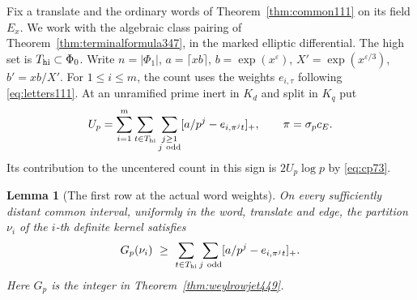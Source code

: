 \documentclass[a4paper,11pt]{article}
\newtheorem{lemma}[proposition]{Lemma}
\theoremstyle{definition}
\theoremstyle{remark}
\numberwithin{equation}{section}
\begin{document}
Fix a translate and the ordinary words of Theorem~\ref{thm:common111}
on its field \(E_x\). We work with the algebraic class pairing of
Theorem~\ref{thm:terminalformula347}, in the marked elliptic
differential. The high set is \(T_{\rm hi}\subset\Phi_0\).
Write \(n=|\Phi_1|\), \(a=\lceil xb\rceil\),
\(b=\exp(x^\varepsilon)\), \(X'=\exp(x^{\varepsilon/3})\),
\(b'=xb/X'\). For \(1\le i\le m\), the count uses the weights
\(e_{i,\tau}\) following \eqref{eq:letters111}.
At an unramified prime inert in \(K_d\) and split in \(K_q\) put
\[
 U_p=\sum_{i=1}^m\sum_{t\in T_{\rm hi}}
          \sum_{\substack{j\ge1\\j\ {\rm odd}}}
      [a/p^j-e_{i,\pi^jt}]_+,\qquad \pi=\sigma_pc_E .
\]
Its contribution to the uncentered count in this sign is
\(2U_p\log p\) by \eqref{eq:cp73}.

\begin{lemma}[The first row at the actual word weights]\leavevmode
\label{lem:wordfirstrow450}
On every sufficiently distant common interval, uniformly in the
word, translate and edge, the partition \(\nu_i\) of the \(i\)-th
definite kernel satisfies
\[
     G_p(\nu_i)\ \ge\
          \sum_{t\in T_{\rm hi}}\sum_{j\ {\rm odd}}
                 [a/p^j-e_{i,\pi^jt}]_+ .
\]
Here \(G_p\) is the integer in Theorem~\ref{thm:weylrowjet449}.
\end{lemma}
\end{document}
